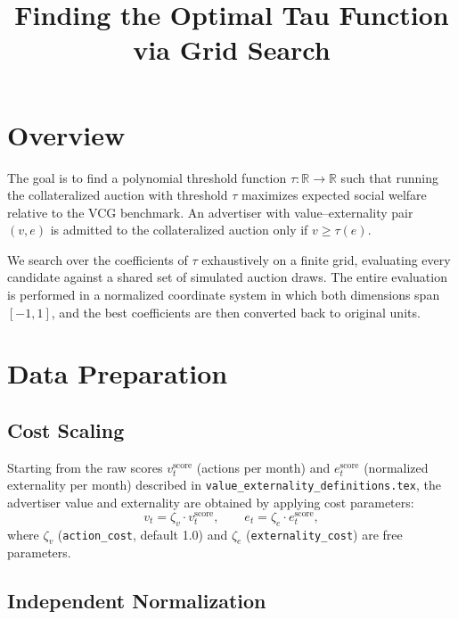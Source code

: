 \documentclass[11pt]{article}
\title{Finding the Optimal Tau Function via Grid Search}
\date{}
\begin{document}
\maketitle

\section{Overview}

The goal is to find a polynomial threshold function
$\tau : \mathbb{R} \to \mathbb{R}$
such that running the collateralized auction with threshold $\tau$
maximizes expected social welfare relative to the VCG benchmark.
An advertiser with value--externality pair $(v, e)$
is admitted to the collateralized auction only if $v \geq \tau(e)$.

We search over the coefficients of $\tau$ exhaustively on a finite grid,
evaluating every candidate against a shared set of simulated auction draws.
The entire evaluation is performed in a normalized coordinate system
in which both dimensions span $[-1, 1]$,
and the best coefficients are then converted back to original units.

\section{Data Preparation}

\subsection{Cost Scaling}

Starting from the raw scores $v_t^{\text{score}}$ (actions per month) and
$e_t^{\text{score}}$ (normalized externality per month) described in
\texttt{value\_externality\_definitions.tex}, the advertiser value and
externality are obtained by applying cost parameters:
\begin{equation}
    v_t = \zeta_v \cdot v_t^{\text{score}}, \qquad
    e_t = \zeta_e \cdot e_t^{\text{score}},
    \label{eq:cost_scaling}
\end{equation}
where $\zeta_v$ (\texttt{action\_cost}, default 1.0) and
$\zeta_e$ (\texttt{externality\_cost}) are free parameters.

\subsection{Independent Normalization}
\end{document}
